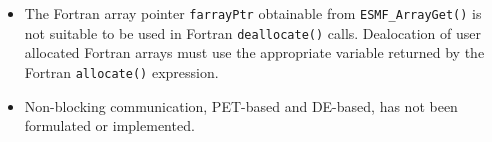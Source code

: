 
\begin{itemize}
\item The Fortran array pointer {\tt farrayPtr} obtainable from
{\tt ESMF\_ArrayGet()} is not suitable to be used in Fortran {\tt deallocate()}
calls. Dealocation of user allocated Fortran arrays must use the appropriate variable returned by the Fortran {\tt allocate()} expression.
\item Non-blocking communication, PET-based and DE-based, has not been formulated or implemented.
\end{itemize}

